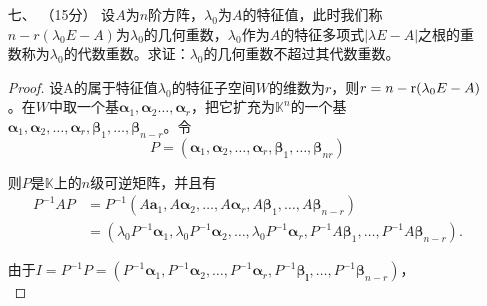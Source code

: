\begin{enumerate}[1~]
\item[七、]（15分）
设$A$为$n$阶方阵，$\lambda_0$为$A$的特征值，此时我们称$n-r(\lambda_0E-A)$为$\lambda_0$的几何重数，$\lambda_0$作为$A$的特征多项式$|\lambda E-A|$之根的重数称为$\lambda_0$的代数重数。求证：$\lambda_0$的几何重数不超过其代数重数。
\begin{proof}
设A的属于特征值$\lambda_0$的特征子空间$W$的维数为$r$，则$r=n-{\rm r}(\lambda_0 E-A)$。在$W$中取一个基$\boldsymbol{\alpha} _ { 1 } , \boldsymbol{\alpha} _ { 2 }\dots , \boldsymbol{\alpha} _ { r }$，把它扩充为$\mathbb{K}^n$的一个基$\boldsymbol{\alpha} _ { 1 } , \boldsymbol{\alpha} _ { 2 } , \dots , \boldsymbol{\alpha} _ { r } , \boldsymbol { \boldsymbol{\beta} } _ { 1 } , \dots , \boldsymbol { \boldsymbol{\beta} } _ { n - r }$。令
\[
P = \left( \boldsymbol{\alpha} _ { 1 } , \boldsymbol{\alpha} _ { 2 } , \dots , \boldsymbol{\alpha} _ { r } , \boldsymbol { \boldsymbol{\beta} } _ { 1 } , \dots , \boldsymbol { \boldsymbol{\beta} } _ { n r } \right)
\]

则$P$是$\mathbb{K}$上的$n$级可逆矩阵，并且有\begin{align*}
P ^ { - 1 } A P &= P ^ { - 1 } \left( A \boldsymbol { a } _ { 1 } , A \boldsymbol{\alpha} _ { 2 } , \dots , A \boldsymbol{\alpha} _ { r } , A \boldsymbol { \boldsymbol{\beta} } _ { 1 } , \dots , A \boldsymbol { \boldsymbol{\beta} } _ { n - r } \right)\\
&= \left( \lambda _ { 0 } P ^ { - 1 } \boldsymbol{\alpha} _ { 1 } , \lambda _ { 0 } P ^ { - 1 } \boldsymbol{\alpha} _ { 2 } , \dots , \lambda _ { 0 } P ^ { - 1 } \boldsymbol{\alpha} _ { r } , P ^ { - 1 } A \boldsymbol { \boldsymbol{\beta} } _ { 1 } , \dots , P ^ { - 1 } A \boldsymbol { \boldsymbol{\beta} } _ { n - r } \right).
\end{align*}

由于$I = P ^ { - 1 } P = \left( P ^ { - 1 } \boldsymbol{\alpha} _ { 1 } , P ^ { - 1 } \boldsymbol{\alpha} _ { 2 } , \dots , P ^ { - 1 } \boldsymbol{\alpha} _ { r } , P ^ { - 1 } \boldsymbol { \boldsymbol{\beta} } _ { \mathbf { l } } , \dots , P ^ { - 1 } \boldsymbol { \boldsymbol{\beta} } _ { n - r } \right)$，\\


\end{proof}
\end{enumerate}
